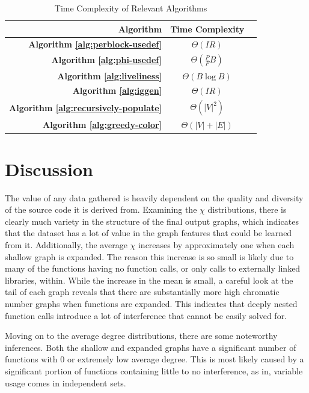 \documentclass{article}
\begin{document}
\begin{table}[H]
\centering

\caption{Time Complexity of Relevant Algorithms }
\label{tab:bigoh}
\begin{tabular}{rcc}
\toprule
\textbf{Algorithm} & \textbf{Time Complexity} \\
\midrule
\textbf{Algorithm \ref{alg:perblock-usedef}}  & $\Theta(IR)$ \\
\textbf{Algorithm \ref{alg:phi-usedef}}  & $\Theta(\frac{P}{F}B)$ \\
\textbf{Algorithm \ref{alg:liveliness}}  & $\Theta(B\log{B})$ \\
\textbf{Algorithm \ref{alg:iggen}}  & $\Theta(IR)$ \\
\textbf{Algorithm \ref{alg:recursively-populate}}  & $\Theta(|V|^{2})$ \\
\textbf{Algorithm \ref{alg:greedy-color}}  & $\Theta(|V| + |E|)$ \\

\bottomrule

\end{tabular}
\captionsetup[sub]{font=scriptsize}
\end{table}



\section{Discussion}

The value of any data gathered is heavily dependent on the quality and diversity of the source code it is derived from. Examining the $\chi$ distributions, there is clearly much variety in the structure of the final output graphs, which indicates that the dataset has a lot of value in the graph features that could be learned from it. Additionally, the average $\chi$ increases by approximately one when each shallow graph is expanded. The reason this increase is so small is likely due to many of the functions having no function calls, or only calls to externally linked libraries, within. While the increase in the mean is small, a careful look at the tail of each graph reveals that there are substantially more high chromatic number graphs when functions are expanded. This indicates that deeply nested function calls introduce a lot of interference that cannot be easily solved for.

Moving on to the average degree distributions, there are some noteworthy inferences. Both the shallow and expanded graphs have a significant number of functions with 0 or extremely low average degree. This is most likely caused by a significant portion of functions containing little to no interference, as in, variable usage comes in independent sets.
\end{document}
